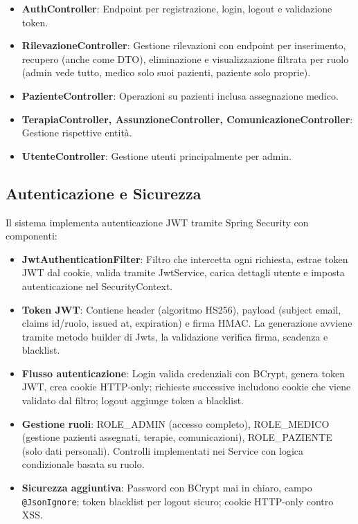 \documentclass{report}
\begin{document}
\begin{itemize}
    \item \textbf{AuthController}: Endpoint per registrazione, login, logout e validazione token.

    \item \textbf{RilevazioneController}: Gestione rilevazioni con endpoint per inserimento, recupero 
    (anche come DTO), eliminazione e visualizzazione filtrata per ruolo (admin vede tutto, medico solo suoi 
    pazienti, paziente solo proprie).

    \item \textbf{PazienteController}: Operazioni su pazienti inclusa assegnazione medico.

    \item \textbf{TerapiaController, AssunzioneController, ComunicazioneController}: Gestione rispettive entità.

    \item \textbf{UtenteController}: Gestione utenti principalmente per admin.
\end{itemize}

\subsection{Autenticazione e Sicurezza}
Il sistema implementa autenticazione JWT tramite Spring Security con componenti:

\begin{itemize}
    \item \textbf{JwtAuthenticationFilter}: Filtro che intercetta ogni richiesta, estrae token JWT dal cookie, 
    valida tramite JwtService, carica dettagli utente e imposta autenticazione nel SecurityContext.

    \item \textbf{Token JWT}: Contiene header (algoritmo HS256), payload (subject email, claims id/ruolo, issued 
    at, expiration) e firma HMAC. La generazione avviene tramite metodo builder di Jwts, la validazione verifica 
    firma, scadenza e blacklist.

    \item \textbf{Flusso autenticazione}: Login valida credenziali con BCrypt, genera token JWT, crea cookie 
    HTTP-only; richieste successive includono cookie che viene validato dal filtro; logout aggiunge token a 
    blacklist.

    \item \textbf{Gestione ruoli}: ROLE\_ADMIN (accesso completo), ROLE\_MEDICO (gestione pazienti assegnati, 
    terapie, comunicazioni), ROLE\_PAZIENTE (solo dati personali). Controlli implementati nei Service con logica 
    condizionale basata su ruolo.

    \item \textbf{Sicurezza aggiuntiva}: Password con BCrypt mai in chiaro, campo \texttt{@JsonIgnore}; token 
    blacklist per logout sicuro; cookie HTTP-only contro XSS.

\end{itemize}
\end{document}
